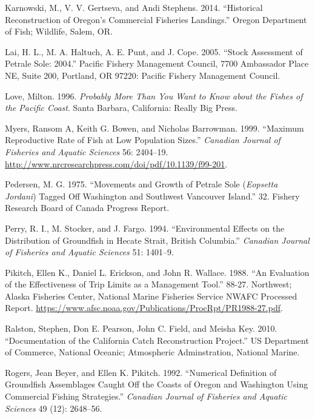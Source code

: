 \documentclass[
]{scrartcl}
\newlength{\cslhangindent}
\newenvironment{CSLReferences}[2] %
 {\begin{list}{}{%
  \setlength{\itemindent}{0pt}
  \setlength{\leftmargin}{0pt}
  \setlength{\parsep}{0pt}
  \ifodd #1
   \setlength{\leftmargin}{\cslhangindent}
   \setlength{\itemindent}{-1\cslhangindent}
  \fi
  \setlength{\itemsep}{#2\baselineskip}}}
 {\end{list}}
\begin{document}
\begin{CSLReferences}{1}{0}
Karnowski, M., V. V. Gertseva, and Andi Stephens. 2014. {``Historical
{Reconstruction} of {Oregon}'s {Commercial} {Fisheries} {Landings}.''}
Oregon Department of Fish; Wildlife, Salem, OR.

Lai, H. L., M. A. Haltuch, A. E. Punt, and J. Cope. 2005. {``Stock
Assessment of Petrale Sole: 2004.''} Pacific Fishery Management Council,
7700 Ambassador Place NE, Suite 200, Portland, OR 97220: Pacific Fishery
Management Council.

Love, Milton. 1996. \emph{Probably More Than You Want to Know about the
Fishes of the {Pacific} {Coast}}. Santa Barbara, California: Really Big
Press.

Myers, Ransom A, Keith G. Bowen, and Nicholas Barrowman. 1999.
{``Maximum Reproductive Rate of Fish at Low Population Sizes.''}
\emph{Canadian Journal of Fisheries and Aquatic Sciences} 56: 2404--19.
\url{http://www.nrcresearchpress.com/doi/pdf/10.1139/f99-201}.

Pedersen, M. G. 1975. {``Movements and Growth of Petrale Sole
(\emph{{Eopsetta} Jordani}) Tagged Off {Washington} and Southwest
{Vancouver} {Island}.''} 32. Fishery Research Board of Canada Progress
Report.

Perry, R. I., M. Stocker, and J. Fargo. 1994. {``Environmental Effects
on the Distribution of Groundfish in {Hecate} {Strait}, {British}
{Columbia}.''} \emph{Canadian Journal of Fisheries and Aquatic Sciences}
51: 1401--9.

Pikitch, Ellen K., Daniel L. Erickson, and John R. Wallace. 1988. {``An
Evaluation of the Effectiveness of Trip Limits as a Management Tool.''}
88-27. Northwest; Alaska Fisheries Center, National Marine Fisheries
Service NWAFC Processed Report.
\url{https://www.afsc.noaa.gov/Publications/ProcRpt/PR1988-27.pdf}.

Ralston, Stephen, Don E. Pearson, John C. Field, and Meisha Key. 2010.
{``Documentation of the {California} Catch Reconstruction Project.''} US
Department of Commerce, National Oceanic; Atmospheric Adminstration,
National Marine.

Rogers, Jean Beyer, and Ellen K. Pikitch. 1992. {``Numerical Definition
of Groundfish Assemblages Caught Off the Coasts of {Oregon} and
{Washington} Using Commercial Fishing Strategies.''} \emph{Canadian
Journal of Fisheries and Aquatic Sciences} 49 (12): 2648--56.


\end{CSLReferences}
\end{document}

